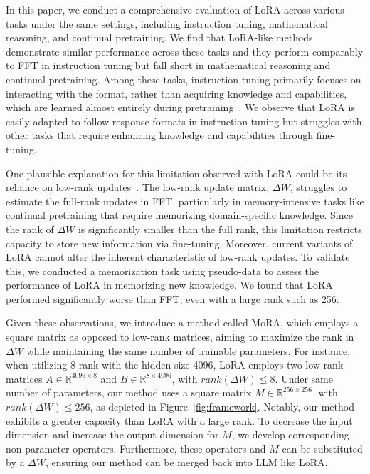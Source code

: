 \documentclass[11pt]{article}
\begin{document}
In this paper, we conduct a comprehensive evaluation of LoRA across various tasks under the same settings, including instruction tuning, mathematical reasoning, and continual pretraining. We find that LoRA-like methods demonstrate similar performance across these tasks and they perform comparably to FFT in instruction tuning but fall short in mathematical reasoning and continual pretraining. Among these tasks, instruction tuning primarily focuses on interacting with the format, rather than acquiring knowledge and capabilities, which are learned almost entirely during pretraining~\cite{zhou2024lima}. We observe that LoRA is easily adapted to follow response formats in instruction tuning but struggles with other tasks that require enhancing knowledge and capabilities through fine-tuning.

One plausible explanation for this limitation observed with LoRA could be its reliance on low-rank updates~\cite{lialin2023stack}. The low-rank update matrix, $\Delta W$, struggles to estimate the full-rank updates in FFT, particularly in memory-intensive tasks like continual pretraining that require memorizing domain-specific knowledge.
Since the rank of $\Delta W$ is significantly smaller than the full rank, this limitation restricts capacity to store new information via fine-tuning. Moreover, current variants of LoRA cannot alter the inherent characteristic of low-rank updates.
To validate this, we conducted a memorization task using pseudo-data to assess the performance of LoRA in memorizing new knowledge. We found that LoRA performed significantly worse than FFT, even with a large rank such as 256.

Given these observations, we introduce a method called MoRA, which employs a square matrix as opposed to low-rank matrices, aiming to maximize the rank in $\Delta W$ while maintaining the same number of trainable parameters. For instance, when utilizing 8 rank with the hidden size 4096, LoRA employs two low-rank matrices $A\in \mathbb{R}^{4096 \times 8}$ and $B\in \mathbb{R}^{8 \times 4096}$, with $rank(\Delta W) \leq 8$. Under same number of parameters, our method uses a square matrix $M \in \mathbb{R}^{256 \times 256}$, with $rank(\Delta W) \leq 256$, as depicted in Figure~\ref{fig:framework}.
Notably, our method exhibits a greater capacity than LoRA with a large rank.
To decrease the input dimension and increase the output dimension for $M$, we develop corresponding non-parameter operators.
Furthermore, these operators and $M$ can be substituted by a $\Delta W$, ensuring our method can be merged back into LLM like LoRA.
\end{document}
